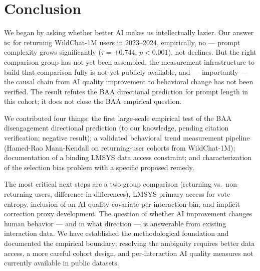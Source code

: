 \section{Conclusion}
\label{sec:conclusion}

We began by asking whether better AI makes us intellectually lazier. Our answer is: for returning WildChat-1M users in 2023--2024, empirically, no --- prompt complexity grows significantly ($\tau = +0.744$, $p < 0.001$), not declines. But the right comparison group has not yet been assembled, the measurement infrastructure to build that comparison fully is not yet publicly available, and --- importantly --- the causal chain from AI quality improvement to behavioral change has not been verified. The result refutes the BAA directional prediction for prompt length in this cohort; it does not close the BAA empirical question.

We contributed four things: the first large-scale empirical test of the BAA disengagement directional prediction (to our knowledge, pending citation verification; negative result); a validated behavioral trend measurement pipeline (Hamed-Rao Mann-Kendall on returning-user cohorts from WildChat-1M); documentation of a binding LMSYS data access constraint; and characterization of the selection bias problem with a specific proposed remedy.

The most critical next steps are a two-group comparison (returning vs.\ non-returning users, difference-in-differences), LMSYS primary access for vote entropy, inclusion of an AI quality covariate per interaction bin, and implicit correction proxy development. The question of whether AI improvement changes human behavior --- and in what direction --- is answerable from existing interaction data. We have established the methodological foundation and documented the empirical boundary; resolving the ambiguity requires better data access, a more careful cohort design, and per-interaction AI quality measures not currently available in public datasets.
